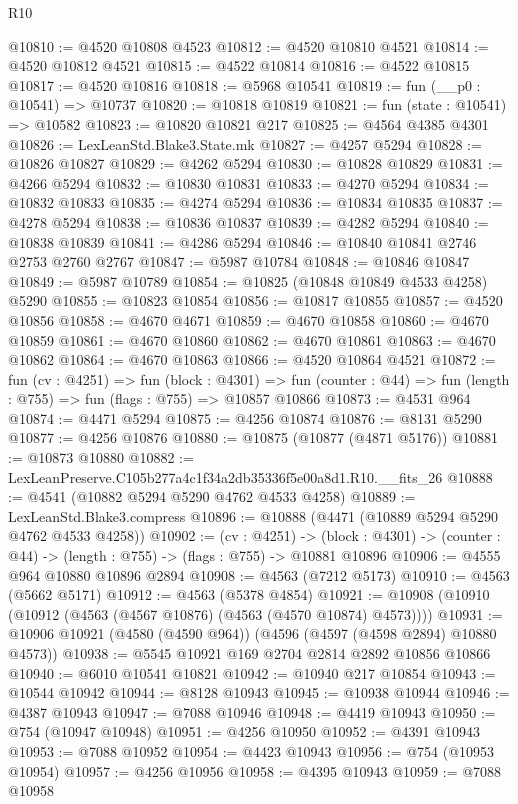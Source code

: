 \begin{lexlean}{R10}
\begin{coremodule}
@10810 := @4520 @10808 @4523
@10812 := @4520 @10810 @4521
@10814 := @4520 @10812 @4521
@10815 := @4522 @10814
@10816 := @4522 @10815
@10817 := @4520 @10816
@10818 := @5968 @10541
@10819 := fun (__p0 : @10541) => @10737
@10820 := @10818 @10819
@10821 := fun (state : @10541) => @10582
@10823 := @10820 @10821 @217
@10825 := @4564 @4385 @4301
@10826 := LexLeanStd.Blake3.State.mk
@10827 := @4257 @5294
@10828 := @10826 @10827
@10829 := @4262 @5294
@10830 := @10828 @10829
@10831 := @4266 @5294
@10832 := @10830 @10831
@10833 := @4270 @5294
@10834 := @10832 @10833
@10835 := @4274 @5294
@10836 := @10834 @10835
@10837 := @4278 @5294
@10838 := @10836 @10837
@10839 := @4282 @5294
@10840 := @10838 @10839
@10841 := @4286 @5294
@10846 := @10840 @10841 @2746 @2753 @2760 @2767
@10847 := @5987 @10784
@10848 := @10846 @10847
@10849 := @5987 @10789
@10854 := @10825 (@10848 @10849 @4533 @4258) @5290
@10855 := @10823 @10854
@10856 := @10817 @10855
@10857 := @4520 @10856
@10858 := @4670 @4671
@10859 := @4670 @10858
@10860 := @4670 @10859
@10861 := @4670 @10860
@10862 := @4670 @10861
@10863 := @4670 @10862
@10864 := @4670 @10863
@10866 := @4520 @10864 @4521
@10872 := fun (cv : @4251) =>
  fun (block : @4301) =>
  fun (counter : @44) => fun (length : @755) => fun (flags : @755) => @10857 @10866
@10873 := @4531 @964
@10874 := @4471 @5294
@10875 := @4256 @10874
@10876 := @8131 @5290
@10877 := @4256 @10876
@10880 := @10875 (@10877 (@4871 @5176))
@10881 := @10873 @10880
@10882 := LexLeanPreserve.C105b277a4c1f34a2db35336f5e00a8d1.R10.__fits_26
@10888 := @4541 (@10882 @5294 @5290 @4762 @4533 @4258)
@10889 := LexLeanStd.Blake3.compress
@10896 := @10888 (@4471 (@10889 @5294 @5290 @4762 @4533 @4258))
@10902 := (cv : @4251) ->
  (block : @4301) -> (counter : @44) -> (length : @755) -> (flags : @755) -> @10881 @10896
@10906 := @4555 @964 @10880 @10896 @2894
@10908 := @4563 (@7212 @5173)
@10910 := @4563 (@5662 @5171)
@10912 := @4563 (@5378 @4854)
@10921 := @10908 (@10910 (@10912 (@4563 (@4567 @10876) (@4563 (@4570 @10874) @4573))))
@10931 := @10906 @10921 (@4580 (@4590 @964)) (@4596 (@4597 (@4598 @2894) @10880 @4573))
@10938 := @5545 @10921 @169 @2704 @2814 @2892 @10856 @10866
@10940 := @6010 @10541 @10821
@10942 := @10940 @217 @10854
@10943 := @10544 @10942
@10944 := @8128 @10943
@10945 := @10938 @10944
@10946 := @4387 @10943
@10947 := @7088 @10946
@10948 := @4419 @10943
@10950 := @754 (@10947 @10948)
@10951 := @4256 @10950
@10952 := @4391 @10943
@10953 := @7088 @10952
@10954 := @4423 @10943
@10956 := @754 (@10953 @10954)
@10957 := @4256 @10956
@10958 := @4395 @10943
@10959 := @7088 @10958

\end{coremodule}
\end{lexlean}
